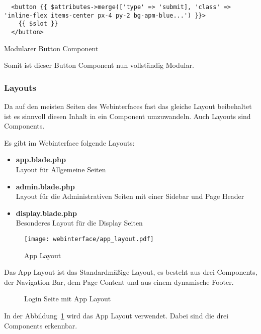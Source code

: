 \begin{listing}[H]
  \begin{verbatim}
  <button {{ $attributes->merge(['type' => 'submit], 'class' => 'inline-flex items-center px-4 py-2 bg-apm-blue...') }}>
    {{ $slot }}
  </button>
  \end{verbatim}
  \caption{Modularer Button Component}
\end{listing}

Somit ist dieser Button Component nun vollständig Modular.


\subsubsection{Layouts}

Da auf den meisten Seiten des Webinterfaces fast das gleiche Layout beibehaltet ist es sinnvoll diesen Inhalt in ein Component umzuwandeln. Auch Layouts
sind Components.

Es gibt im Webinterface folgende Layouts:

\begin{itemize}
  \item \textbf{app.blade.php}\\
  Layout für Allgemeine Seiten
  \item \textbf{admin.blade.php}\\
  Layout für die Administrativen Seiten mit einer Sidebar und Page Header
  \item \textbf{display.blade.php}\\
  Besonderes Layout für die Display Seiten
\end{itemize}

\begin{figure}[H]
  \centering
  \texttt{[image: webinterface/app\_layout.pdf]}
  \caption{App Layout}
\end{figure}

Das App Layout ist das Standardmäßige Layout, es besteht aus drei Components,
der Navigation Bar, dem Page Content und aus einem dynamische Footer.

\begin{figure}[H]
  \centering
  \caption{Login Seite mit App Layout}
  \label{fig:login_site}
\end{figure}

In der Abbildung~\ref{fig:login_site} wird das App Layout verwendet. Dabei sind
die drei Components erkennbar.

